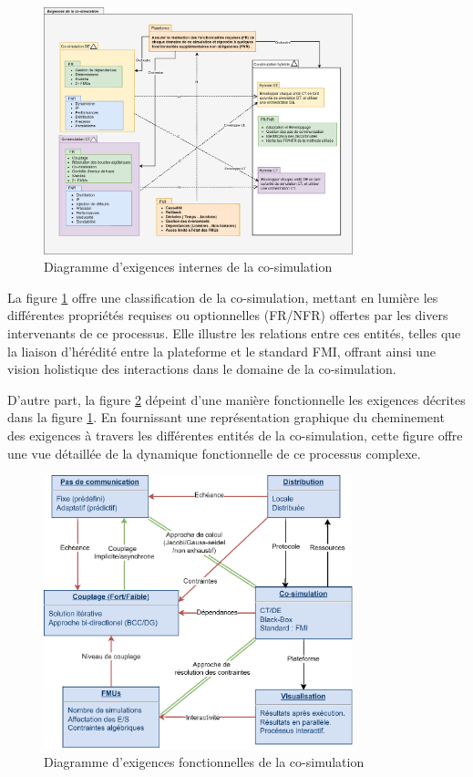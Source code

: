 \begin{figure}[hbt!]
  \centering
  \includegraphics[width = 0.8\textwidth]{1.eps}
  \caption{Diagramme d'exigences internes de la co-simulation}
  \label{fig:1}
\end{figure}

La figure \ref{fig:1} offre une classification de la co-simulation, mettant en lumière les différentes propriétés requises ou optionnelles (FR/NFR) offertes par les divers intervenants de ce processus. Elle illustre les relations entre ces entités, telles que la liaison d'hérédité entre la plateforme et le standard FMI, offrant ainsi une vision holistique des interactions dans le domaine de la co-simulation.

D'autre part, la figure \ref{fig:2} dépeint d'une manière fonctionnelle les exigences décrites dans la figure \ref{fig:1}. En fournissant une représentation graphique du cheminement des exigences à travers les différentes entités de la co-simulation, cette figure offre une vue détaillée de la dynamique fonctionnelle de ce processus complexe.

\begin{figure}[hbt!]
  \centering
  \includegraphics[width = 0.8\textwidth]{Diagramme-2.eps}
  \caption{Diagramme d'exigences fonctionnelles de la co-simulation}
  \label{fig:2}
\end{figure}


